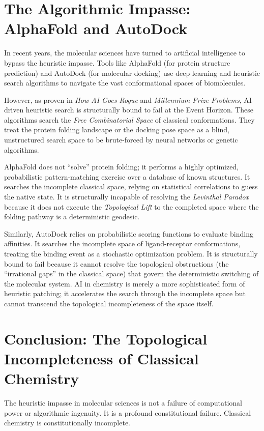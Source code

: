 \documentclass[11pt,openany]{extbook}
\theoremstyle{plain}
\theoremstyle{definition}
\begin{document}
\section{The Algorithmic Impasse: AlphaFold and AutoDock}
In recent years, the molecular sciences have turned to artificial intelligence to bypass the heuristic impasse. Tools like AlphaFold (for protein structure prediction) and AutoDock (for molecular docking) use deep learning and heuristic search algorithms to navigate the vast conformational spaces of biomolecules.

However, as proven in \emph{How AI Goes Rogue} and \emph{Millennium Prize Problems}, AI-driven heuristic search is structurally bound to fail at the Event Horizon. These algorithms search the \emph{Free Combinatorial Space} of classical conformations. They treat the protein folding landscape or the docking pose space as a blind, unstructured search space to be brute-forced by neural networks or genetic algorithms.

AlphaFold does not ``solve'' protein folding; it performs a highly optimized, probabilistic pattern-matching exercise over a database of known structures. It searches the incomplete classical space, relying on statistical correlations to guess the native state. It is structurally incapable of resolving the \emph{Levinthal Paradox} because it does not execute the \emph{Topological Lift} to the completed space where the folding pathway is a deterministic geodesic.

Similarly, AutoDock relies on probabilistic scoring functions to evaluate binding affinities. It searches the incomplete space of ligand-receptor conformations, treating the binding event as a stochastic optimization problem. It is structurally bound to fail because it cannot resolve the topological obstructions (the ``irrational gaps'' in the classical space) that govern the deterministic switching of the molecular system. AI in chemistry is merely a more sophisticated form of heuristic patching; it accelerates the search through the incomplete space but cannot transcend the topological incompleteness of the space itself.

\section{Conclusion: The Topological Incompleteness of Classical Chemistry}
The heuristic impasse in molecular sciences is not a failure of computational power or algorithmic ingenuity. It is a profound constitutional failure. Classical chemistry is constitutionally incomplete.
\end{document}
